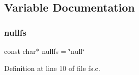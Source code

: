 \subsection{Variable Documentation}
\mbox{\label{a00143_a36265ac74fd925405e1179e799961f1e_a36265ac74fd925405e1179e799961f1e}} 
\subsubsection{\texorpdfstring{nullfs}{nullfs}}
{\footnotesize\ttfamily const char$\ast$ nullfs = \char`\"{}null\char`\"{}}



Definition at line 10 of file fs.\+c.

